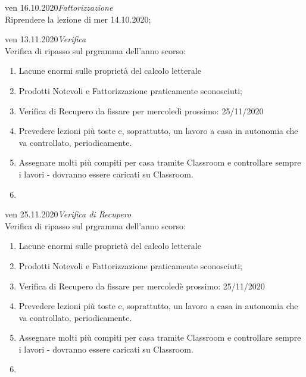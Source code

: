 \documentclass[10pt, a4paper twoside, notitlepage, notoc, justified]{tufte-handout}
\begin{document}
\begin{loggentry}{ven 16.10.2020}{\em Fattorizzazione}\\
Riprendere la lezione di mer 14.10.2020;
\end{loggentry}

\begin{loggentry}{ven 13.11.2020}{\em Verifica}\\
Verifica di ripasso sul prgramma dell'anno scorso: 
\begin{enumerate}
	\item Lacune enormi sulle proprietà del calcolo letterale
	\item Prodotti Notevoli e Fattorizzazione praticamente sconosciuti;
	\item Verifica di Recupero da fissare per mercoledì prossimo: 25/11/2020
	\item Prevedere lezioni più toste e, soprattutto, un lavoro a casa in autonomia che va controllato, periodicamente.
	\item Assegnare molti più compiti per casa tramite Classroom e controllare sempre i lavori - dovranno essere caricati su Classroom.
	\item 
\end{enumerate}
\end{loggentry}



\begin{loggentry}{ven 25.11.2020}{\em Verifica di Recupero}\\
Verifica di ripasso sul prgramma dell'anno scorso: 
\begin{enumerate}
	\item Lacune enormi sulle proprietà del calcolo letterale
	\item Prodotti Notevoli e Fattorizzazione praticamente sconosciuti;
	\item Verifica di Recupero da fissare per mercoledè prossimo: 25/11/2020
	\item Prevedere lezioni più toste e, soprattutto, un lavoro a casa in autonomia che va controllato, periodicamente.
	\item Assegnare molti più compiti per casa tramite Classroom e controllare sempre i lavori - dovranno essere caricati su Classroom.
	\item 
\end{enumerate}
\end{loggentry}

\end{document}
